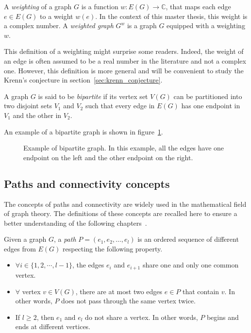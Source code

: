 \begin{definition}
    \label{def:weighted_graph}
    A \textit{weighting} of a graph $G$ is a function $w: E(G) \rightarrow \mathbb{C}$, that maps each edge $e \in E(G)$ to a weight $w(e)$.
    In the context of this master thesis, this weight is a complex number.
    A \textit{weighted graph} $G^w$ is a graph $G$ equipped with a weighting $w$.
\end{definition}

This definition of a weighting might surprise some readers.
Indeed, the weight of an edge is often assumed to be a real number in the literature and not a complex one.
However, this definition is more general and will be convenient to study the Krenn's conjecture in section~\ref{sec:krenn_conjecture}.

\begin{definition}
    \label{def:bipartite_graph}
    A graph $G$ is said to be \textit{bipartite} if its vertex set $V(G)$ can be partitioned into two disjoint sets $V_1$ and $V_2$ such that every edge in $E(G)$ has one endpoint in $V_1$ and the other in $V_2$.
\end{definition}

An example of a bipartite graph is shown in figure~\ref{fig:bipartite}.
\begin{figure}[H]
    \caption{Example of bipartite graph. In this example, all the edges have one endpoint on the left and the other endpoint on the right.}
    \label{fig:bipartite}
\end{figure}


\subsection{Paths and connectivity concepts}
\label{subsec:paths-and-connectivity-concepts}

The concepts of paths and connectivity are widely used in the mathematical field of graph theory.
The definitions of these concepts are recalled here to ensure a better understanding of the following chapters~\cite{bondy1976graph}.

\begin{definition}[Path]
    \label{def:path}
    Given a graph $G$, a \textit{path} $P = (e_1, e_2, \dots, e_l)$ is an ordered sequence of different edges from $E(G)$ respecting the following property.
    \begin{itemize}
        \item $\forall i \in \{1, 2, \cdots, l - 1\}$, the edges $e_i$ and $e_{i+1}$ share one and only one common vertex.
        \item $\forall$ vertex $v \in V(G)$, there are at most two edges $e \in P$ that contain $v$.
            In other words, $P$ does not pass through the same vertex twice.
        \item If $l \geq 2$, then $e_1$ and $e_l$ do not share a vertex.
            In other words, $P$ begins and ends at different vertices.
    \end{itemize}
\end{definition}

